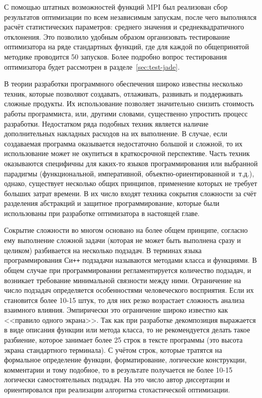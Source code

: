 С помощью штатных возможностей функций MPI был реализован сбор
результатов оптимизации по всем независимым запускам, после чего
выполнялся расчёт статистических параметров: среднего значения и
среднеквадратичного отклонения. Это позволило удобным образом
организовать тестирование оптимизатора на ряде стандартных функций,
где для каждой по общепринятой методике проводится 50 запусков.
 Более подробно вопрос тестирования оптимизатора
будет рассмотрен в разделе~\ref{sec:test-jade}.

В теории разработки программного обеспечения широко известны несколько
техник, которые позволяют создавать, отлаживать, развивать и
поддерживать сложные продукты.  Их использование позволяет
значительно снизить стоимость работы программиста, или, другими
словами, существенно упростить процесс разработки.  Недостатком ряда
подобных техник является наличие дополнительных накладных расходов на
их выполнение.  В случае, если создаваемая программа оказывается
недостаточно большой и сложной, то их использование может не окупиться
в краткосрочной перспективе.  Часть техник оказываются специфичны для
каких-то языков программирования или выбранной парадигмы
(функциональной, императивной, объектно-ориентированной и~т.д.),
однако, существует несколько общих принципов, применение которых не
требует больших затрат времени. В их число входят техника сокрытия
сложности за счёт разделения абстракций и защитное программирование,
которые были использованы при разработке оптимизатора в настоящей
главе.

Сокрытие сложности во многом основано на более общем принципе,
согласно ему выполнение сложной задачи (которая не может быть
выполнена сразу и целиком) разбивается на несколько подзадач. В
терминах языка программирования Си\texttt{++} подзадачи называются
методами класса и функциями.  В общем случае при программировании
регламентируется количество подзадач, и возникает требование
минимальной связности между ними.  Ограничение на число подзадач
определяется особенностями человеческого восприятия. Если их 
становится более 10-15 штук, то для них резко возрастает сложность анализа 
взаимного влияния.  Эмпирически это ограничение широко известно как
<<правило одного экрана>>.  Так как при разработке декомпозиция
выражается в виде описания функции или метода класса, то не
рекомендуется делать такое разбиение, которое занимает более 25 строк
в тексте программы (это высота экрана стандартного
терминала).  С учётом строк, которые тратятся на формальное определение
функции, форматирование, логические конструкции, комментарии и тому
подобное, то в результате получается не более 10-15 логически
самостоятельных подзадач. На это число автор диссертации и
ориентировался при реализации алгоритма стохастической оптимизации.


